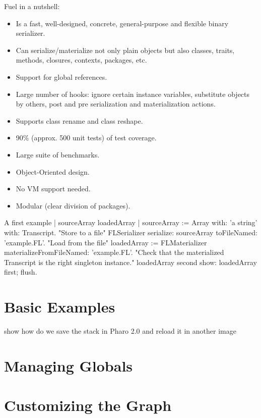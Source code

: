 \documentclass[a4paper,10pt,twoside]{book}
\begin{document}
Fuel in a nutshell: 
\begin{itemize}

\item Is a fast, well-designed, concrete, general-purpose and flexible binary serializer.
\item Can serialize/materialize not only plain objects but also classes, traits, methods, closures, contexts, packages, etc.
\item Support for global references.
\item Large number of hooks: ignore certain instance variables, substitute objects by others, post and pre serialization and materialization actions.
\item Supports class rename and class reshape.
\item 90\% (approx. 500 unit tests) of test coverage.
\item Large suite of benchmarks.
\item Object-Oriented design.
\item No VM support needed.
\item Modular (clear division of packages).
\end{itemize}



\begin{code}{A first example}
| sourceArray loadedArray |
sourceArray := Array with: 'a string' with: Transcript.
"Store to a file"
FLSerializer serialize: sourceArray toFileNamed: 'example.FL'.
"Load from the file"
loadedArray := FLMaterializer materializeFromFileNamed: 'example.FL'.
"Check that the materialized Transcript is the right singleton instance."
loadedArray second show: loadedArray first; flush.
\end{code}



\section{Basic Examples}


show how do we save the stack in Pharo 2.0 and reload it in another image

\section{Managing Globals}

\section{Customizing the Graph}
\end{document}
